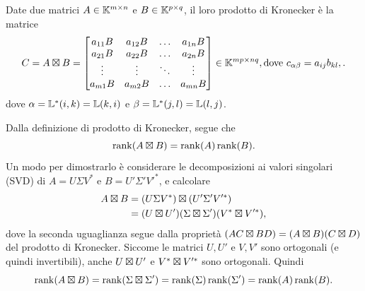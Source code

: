 \begin{definition}
	\label{def:krn}
	Date due matrici $ A \in \mathbb{K}^{m \times n} $ e $ B \in \mathbb{K}^{p \times q} $, il loro prodotto
	di Kronecker è la matrice
	\[
		C = A \boxtimes B =
		\begin{bmatrix}
			a_{11}B & a_{12}B & \ldots & a_{1n}B \\
			a_{21}B & a_{22}B & \ldots & a_{2n}B \\
			\vdots  & \vdots  & \ddots & \vdots  \\
			a_{m1}B & a_{m2}B & \ldots & a_{mn}B \\
		\end{bmatrix}  \in  \mathbb{K}^{mp \times nq}, \text{dove } c_{\alpha \beta} = a_{ij}b_{kl},
		.\]
	dove $ \alpha = \mathbb{L}^*(i,k) = \mathbb{L}(k,i) $ e $ \beta = \mathbb{L}^*(j,l) = \mathbb{L}(l,j) $.

\end{definition}
\begin{remark}
	\label{rmk:rk_krn_prod}
	Dalla definizione di prodotto di Kronecker, segue che
	\begin{equation*}
		\operatorname{rank}(A \mathbin{\boxtimes} B) = \operatorname{rank}(A)\operatorname{rank}(B).
	\end{equation*}
	Un modo per dimostrarlo è considerare le decomposizioni ai valori singolari (SVD) di $ A = U
		\Sigma V^* $ e $ B = U' \Sigma' V'^*$, e calcolare
	\begin{equation*}
		\begin{aligned}
			A \krn B & = \left(U \Sigma V^*\right) \krn \left( U' \Sigma' V'^* \right)                   \\
			         & = \left( U \krn U' \right)\left( \Sigma \krn \Sigma' \right) \left( V^* \krn V'^*
			\right),
		\end{aligned}
	\end{equation*}
	dove la seconda uguaglianza segue dalla proprietà $ (AC \mathbin{\boxtimes} BD) = (A \mathbin{\boxtimes} B)(C \mathbin{\boxtimes} D) $ del
	prodotto di Kronecker. Siccome le matrici $ U,U' $ e $ V,V' $ sono ortogonali (e quindi
	invertibili), anche $ U \mathbin{\boxtimes} U' $ e $ V^* \mathbin{\boxtimes} V'^*$ sono ortogonali. Quindi
	\begin{equation*}
		\operatorname{rank}(A \mathbin{\boxtimes} B) = \operatorname{rank}(\Sigma \mathbin{\boxtimes} \Sigma') = \operatorname{rank}(\Sigma)\operatorname{rank}(\Sigma') = \operatorname{rank}(A)\operatorname{rank}(B).
	\end{equation*}
\end{remark}
